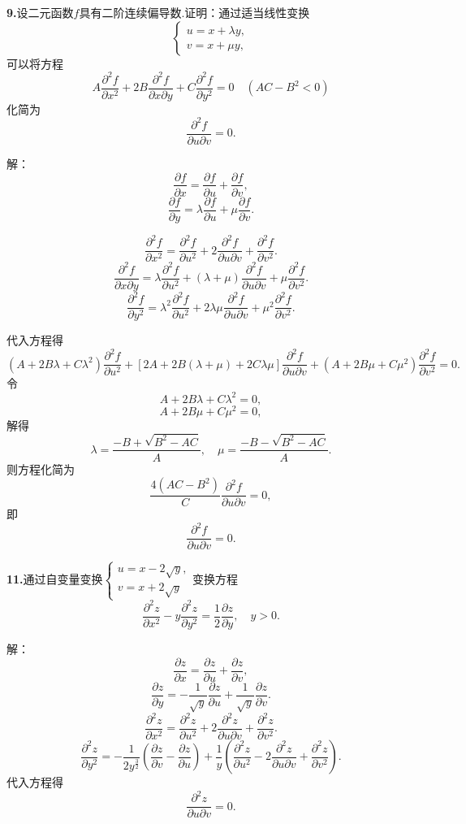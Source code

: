 \documentclass[12pt, a4paper]{article}
\begin{document}
\textbf{9.}设二元函数\(f\)具有二阶连续偏导数.证明：通过适当线性变换
\[\begin{cases}
u = x + \lambda y, \\
v = x + \mu y,
\end{cases}\]
可以将方程
\[A \frac{\partial^2 f}{\partial x^2} + 2B \frac{\partial^2 f}{\partial x \partial y} + C \frac{\partial^2 f}{\partial y^2} = 0 \quad (AC - B^2 < 0)\]
化简为
\[\frac{\partial^2 f}{\partial u \partial v} = 0.\]

解：
\[\frac{\partial f}{\partial x} = \frac{\partial f}{\partial u} + \frac{\partial f}{\partial v},\]
\[\frac{\partial f}{\partial y} = \lambda \frac{\partial f}{\partial u} + \mu \frac{\partial f}{\partial v}.\]

\[\frac{\partial^2 f}{\partial x^2} = \frac{\partial^2 f}{\partial u^2} + 2 \frac{\partial^2 f}{\partial u \partial v} + \frac{\partial^2 f}{\partial v^2}.\]
\[\frac{\partial^2 f}{\partial x \partial y} = \lambda \frac{\partial^2 f}{\partial u^2} + (\lambda + \mu) \frac{\partial^2 f}{\partial u \partial v} + \mu \frac{\partial^2 f}{\partial v^2}.\]
\[\frac{\partial^2 f}{\partial y^2} = \lambda^2 \frac{\partial^2 f}{\partial u^2} + 2 \lambda \mu \frac{\partial^2 f}{\partial u \partial v} + \mu^2 \frac{\partial^2 f}{\partial v^2}.\]

代入方程得
\[(A + 2B \lambda + C \lambda^2) \frac{\partial^2 f}{\partial u^2} + [2A + 2B(\lambda + \mu) + 2C \lambda \mu] \frac{\partial^2 f}{\partial u \partial v} + (A + 2B \mu + C \mu^2) \frac{\partial^2 f}{\partial v^2} = 0.\]
令
\[A + 2B \lambda + C \lambda^2 = 0,\]
\[A + 2B \mu + C \mu^2 = 0,\]
解得
\[\lambda = \frac{-B + \sqrt{B^2 - AC}}{A}, \quad \mu = \frac{-B - \sqrt{B^2 - AC}}{A}.\]
则方程化简为
\[\frac{4(AC - B^2)}{C}\frac{\partial^2 f}{\partial u \partial v} = 0,\]
即
\[\frac{\partial^2 f}{\partial u \partial v} = 0.\]

\textbf{11.}通过自变量变换\(\begin{cases}
u = x - 2\sqrt{y}, \\
v = x + 2\sqrt{y}
\end{cases}\)变换方程
\[\frac{\partial^2 z}{\partial x^2} - y\frac{\partial^2 z}{\partial y^2} = \frac{1}{2}\frac{\partial z}{\partial y}, \quad y > 0.\]

解：
\[\frac{\partial z}{\partial x} = \frac{\partial z}{\partial u} + \frac{\partial z}{\partial v},\]
\[\frac{\partial z}{\partial y} = -\frac{1}{\sqrt{y}} \frac{\partial z}{\partial u} + \frac{1}{\sqrt{y}} \frac{\partial z}{\partial v}.\]
\[\frac{\partial^2 z}{\partial x^2} = \frac{\partial^2 z}{\partial u^2} + 2 \frac{\partial^2 z}{\partial u \partial v} + \frac{\partial^2 z}{\partial v^2}.\]
\[\frac{\partial^2 z}{\partial y^2} = -\frac{1}{2y^{\frac{3}{2}}}\left(\frac{\partial z}{\partial v} - \frac{\partial z}{\partial u}\right) + \frac{1}{y}\left(\frac{\partial^2 z}{\partial u^2} - 2\frac{\partial^2 z}{\partial u \partial v} + \frac{\partial^2 z}{\partial v^2}\right).\]
代入方程得
\[\frac{\partial^2 z}{\partial u \partial v} = 0.\]
\end{document}
